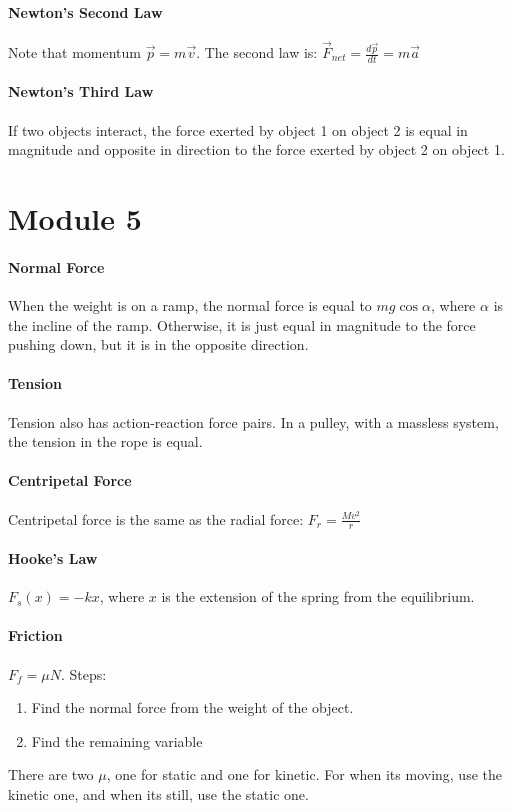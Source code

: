 \documentclass[10pt,letter]{article}
\begin{document}
\paragraph{Newton's Second Law} Note that momentum $\vec{p}=m\vec{v}$. The second law is: $\vec{F}_{net}=\frac{d\vec{p}}{dt}=m\vec{a}$

\paragraph{Newton's Third Law} If two objects interact, the force exerted by object 1 on object 2 is equal in magnitude and opposite in direction to the force exerted by object 2 on object 1. 

\pagebreak

\section*{Module 5}
\paragraph{Normal Force} When the weight is on a ramp, the normal force is equal to $mg\cos\alpha$, where $\alpha$ is the incline of the ramp. Otherwise, it is just equal in magnitude to the force pushing down, but it is in the opposite direction. 

\paragraph{Tension} Tension also has action-reaction force pairs. In a pulley, with a massless system, the tension in the rope is equal. 

\paragraph{Centripetal Force} Centripetal force is the same as the radial force: $F_r=\frac{Mv^2}{r}$ 

\paragraph{Hooke's Law} $F_s(x)=-kx$, where $x$ is the extension of the spring from the equilibrium. 

\paragraph{Friction} $F_f=\mu N$. Steps: 
\begin{enumerate}
    \item Find the normal force from the weight of the object. 
    \item Find the remaining variable
\end{enumerate}
There are two $\mu$, one for static and one for kinetic. For when its moving, use the kinetic one, and when its still, use the static one. 
\end{document}
